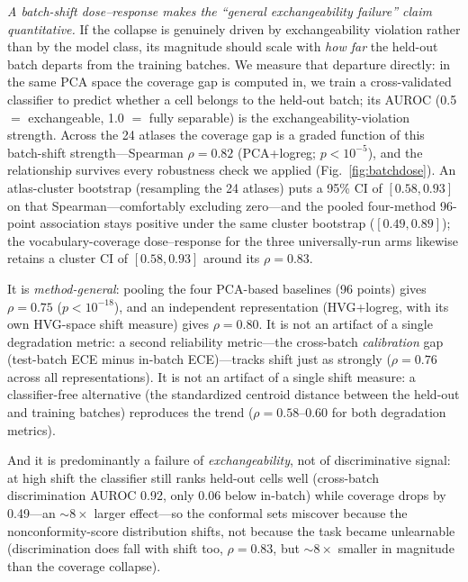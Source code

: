\documentclass[fleqn,10pt,lineno]{wlpeerj}  %
\begin{document}
\emph{A batch-shift dose--response makes the ``general exchangeability failure'' claim quantitative.} If the collapse is genuinely driven by exchangeability violation rather than by the model class, its magnitude should scale with \emph{how far} the held-out batch departs from the training batches. We measure that departure directly: in the same PCA space the coverage gap is computed in, we train a cross-validated classifier to predict whether a cell belongs to the held-out batch; its AUROC (0.5 $=$ exchangeable, 1.0 $=$ fully separable) is the exchangeability-violation strength. Across the 24 atlases the coverage gap is a graded function of this batch-shift strength---Spearman $\rho=0.82$ (PCA+logreg; $p<10^{-5}$), and the relationship survives every robustness check we applied (Fig.~\ref{fig:batchdose}). An atlas-cluster bootstrap (resampling the 24 atlases) puts a 95\% CI of $[0.58,0.93]$ on that Spearman---comfortably excluding zero---and the pooled four-method 96-point association stays positive under the same cluster bootstrap ($[0.49,0.89]$); the vocabulary-coverage dose--response for the three universally-run arms likewise retains a cluster CI of $[0.58,0.93]$ around its $\rho=0.83$.

It is \emph{method-general}: pooling the four PCA-based baselines (96 points) gives $\rho=0.75$ ($p<10^{-18}$), and an independent representation (HVG+logreg, with its own HVG-space shift measure) gives $\rho=0.80$. It is not an artifact of a single degradation metric: a second reliability metric---the cross-batch \emph{calibration} gap (test-batch ECE minus in-batch ECE)---tracks shift just as strongly ($\rho=0.76$ across all representations). It is not an artifact of a single shift measure: a classifier-free alternative (the standardized centroid distance between the held-out and training batches) reproduces the trend ($\rho=0.58$--$0.60$ for both degradation metrics).

And it is predominantly a failure of \emph{exchangeability}, not of discriminative signal: at high shift the classifier still ranks held-out cells well (cross-batch discrimination AUROC 0.92, only 0.06 below in-batch) while coverage drops by 0.49---an ${\sim}8\times$ larger effect---so the conformal sets miscover because the nonconformity-score distribution shifts, not because the task became unlearnable (discrimination does fall with shift too, $\rho=0.83$, but ${\sim}8\times$ smaller in magnitude than the coverage collapse).
\end{document}
